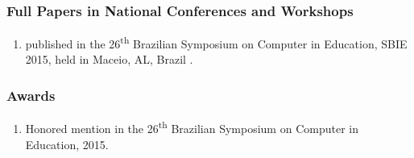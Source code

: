 \subsubsection*{Full Papers in National Conferences and Workshops}

\begin{enumerate}
\item
{} published in the 26\textsuperscript{th} Brazilian Symposium on Computer in Education, SBIE 2015, held in Maceio, AL, Brazil \cite{ChallcoAndradeOliveiraMizoguchiIsotani2015}.
\end{enumerate}



\subsubsection*{Awards}

\begin{enumerate}
\item
Honored mention in the 26\textsuperscript{th} Brazilian Symposium on Computer in Education, 2015.
\end{enumerate}

